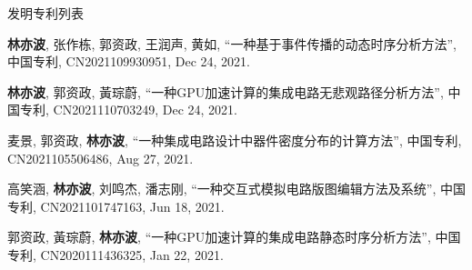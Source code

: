 \begin{rSection}{发明专利列表}
\begin{description}[font=\normalfont, rightmargin=2em]
{}
            

\item[{[P5]}]{
        \textbf{林亦波}, 张作栋, 郭资政, 王润声, 黄如, 
    ``一种基于事件传播的动态时序分析方法'', 
    中国专利, CN2021109930951, Dec 24, 2021.
    
}
            

\item[{[P4]}]{
        \textbf{林亦波}, 郭资政, 黃琮蔚, 
    ``一种GPU加速计算的集成电路无悲观路径分析方法'', 
    中国专利, CN2021110703249, Dec 24, 2021.
    
}
            

\item[{[P3]}]{
        麦景, 郭资政, \textbf{林亦波}, 
    ``一种集成电路设计中器件密度分布的计算方法'', 
    中国专利, CN2021105506486, Aug 27, 2021.
    
}
            

\item[{[P2]}]{
        高笑涵, \textbf{林亦波}, 刘鸣杰, 潘志刚, 
    ``一种交互式模拟电路版图编辑方法及系统'', 
    中国专利, CN2021101747163, Jun 18, 2021.
    
}
            

\item[{[P1]}]{
        郭资政, 黃琮蔚, \textbf{林亦波}, 
    ``一种GPU加速计算的集成电路静态时序分析方法'', 
    中国专利, CN2020111436325, Jan 22, 2021.
    
}
            

\end{description}
    

\end{rSection}


